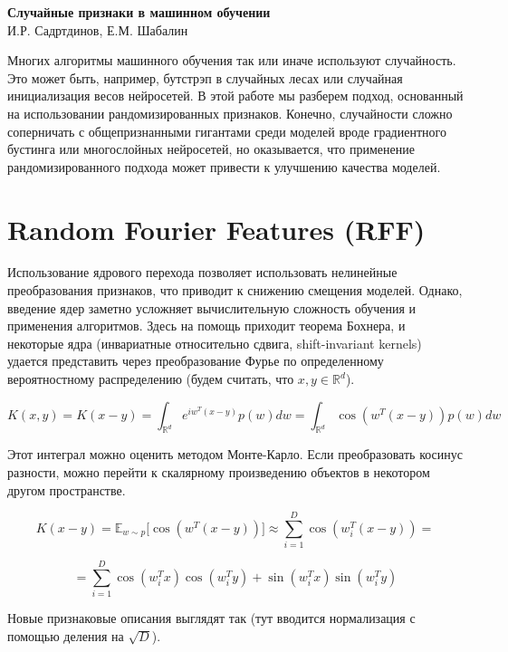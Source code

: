 \documentclass{article}
\newcommand{\R}{\mathbb{R}}
\begin{document}
\begin{center}
    \textbf{{\huge Случайные признаки в машинном обучении}} \href{https://github.com/isadrtdinov/random-features}{\Large \faGithub} \\
    \vspace{10pt}
    {\Large И.Р. Садртдинов, Е.М. Шабалин}
\end{center}{}

\vspace{1cm}

Многих алгоритмы машинного обучения так или иначе используют случайность. Это может быть, например, бутстрэп в случайных лесах или случайная инициализация весов нейросетей. В этой работе мы разберем подход, основанный на использовании рандомизированных признаков. Конечно, случайности сложно соперничать с общепризнанными гигантами среди моделей вроде градиентного бустинга или многослойных нейросетей, но оказывается, что применение рандомизированного подхода может привести к улучшению качества моделей. 

\section{Random Fourier Features (RFF)}

Использование ядрового перехода позволяет использовать нелинейные преобразования признаков, что приводит к снижению смещения моделей. Однако, введение ядер заметно усложняет вычислительную сложность обучения и применения алгоритмов. Здесь на помощь приходит теорема Бохнера, и некоторые ядра (инвариатные относительно сдвига, shift-invariant kernels) удается представить через преобразование Фурье по определенному вероятностному распределению (будем считать, что $x, y \in \R^d$). 

$$
K(x, y) = K(x - y) = \int_{\R^d} e^{i w^T (x - y)} p(w) dw = \int_{\R^d} \cos \left(w^T (x - y) \right) p(w) dw
$$

\noindent
Этот интеграл можно оценить методом Монте-Карло. Если преобразовать косинус разности, можно перейти к скалярному произведению объектов в некотором другом пространстве.

$$
K(x - y) = \mathbb{E}_{w \sim p} \Big[\cos \left(w^T (x - y) \right)\Big] \approx \sum_{i=1}^D \cos \left(w^T_i (x - y) \right) = 
$$

$$
= \sum_{i=1}^D \cos \left(w_i^T x\right) \cos \left(w_i^T y\right) + \sin \left(w_i^T x\right) \sin \left(w_i^T y\right)
$$

\noindent
Новые признаковые описания выглядят так (тут вводится нормализация с помощью 
деления на $\sqrt{D}$).
\end{document}

